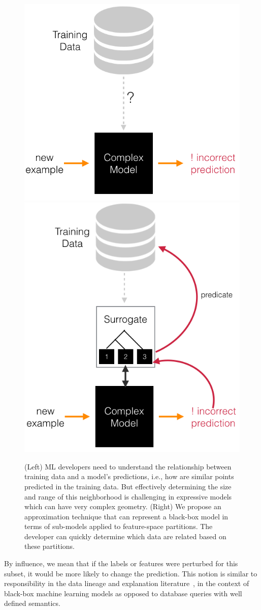 \begin{figure}
    \centering
    \includegraphics[width=0.48\columnwidth]{figures/teaser1.png}
    \includegraphics[width=0.48\columnwidth]{figures/teaser2.png}
    \caption{(Left) ML developers need to understand the relationship between training data and a model's predictions, i.e., how are similar points predicted in the training data. But effectively determining the size and range of this neighborhood is challenging in expressive models which can have very complex geometry. (Right) We propose an approximation technique that can represent a black-box model in terms of sub-models applied to feature-space partitions. The developer can quickly determine which data are related based on these partitions.}
    \label{fig:my_label}
\end{figure}



By influence, we mean that if the labels or features were perturbed for this subset, it would be more likely to change the prediction.
This notion is similar to responsibility in the data lineage and explanation literature~\cite{scorpion,alexandra,reversedatamanagamente,semirings}, in the context of black-box machine learning models as opposed to database queries with well defined semantics.

